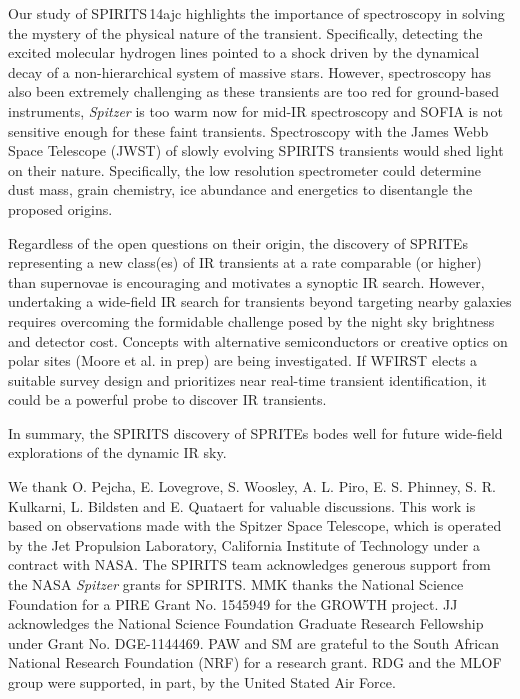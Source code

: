 \documentclass[twocolumn,times]{aastex6}
\begin{document}
Our study of  SPIRITS\,14ajc highlights the importance of spectroscopy in solving the mystery of the physical nature
of the transient. Specifically, detecting the excited molecular hydrogen lines pointed to a shock driven by the dynamical
decay of a non-hierarchical system of massive stars. However, spectroscopy has also been extremely challenging as these transients are
too red for ground-based instruments, {\it Spitzer} is too warm now for mid-IR spectroscopy and SOFIA is not sensitive enough for these
faint transients. Spectroscopy with the James Webb Space Telescope (JWST) of slowly evolving SPIRITS transients 
would shed light on their nature. Specifically, the low resolution spectrometer could determine dust mass, 
grain chemistry, ice abundance and energetics to disentangle the proposed origins.
   
Regardless of the open questions on their origin, the discovery of SPRITEs representing a new class(es) of IR transients at a rate 
comparable (or higher) than supernovae is encouraging and motivates a synoptic IR search. However, undertaking a wide-field IR search for transients
beyond targeting nearby galaxies requires overcoming the formidable challenge posed by the night sky brightness and detector cost. Concepts with alternative semiconductors \citep{Sullivan2014} or
creative optics on polar sites (Moore et al. in prep) are being investigated. If WFIRST elects a suitable survey design and prioritizes near real-time transient 
identification, it could be a powerful probe to discover IR transients.  

In summary, the SPIRITS discovery of SPRITEs bodes well for future wide-field explorations of the dynamic 
IR sky.

\bigskip
\bigskip
We thank O. Pejcha, E. Lovegrove, S. Woosley, A. L. Piro, E. S. Phinney, S. R. Kulkarni, L. Bildsten and E. Quataert for valuable discussions. 
This work is based on observations made with the Spitzer Space Telescope, which is operated by the Jet Propulsion Laboratory, California Institute of Technology under a contract with NASA. 
The SPIRITS team acknowledges generous support from the NASA {\it Spitzer} grants for SPIRITS. 
MMK thanks the National Science Foundation for a PIRE Grant No. 1545949 for the GROWTH project. JJ acknowledges the National Science Foundation Graduate Research Fellowship under 
Grant No. DGE-1144469. PAW and SM are grateful to the South African National Research Foundation (NRF) for a research grant.
RDG and the MLOF group were supported, in part, by the United Stated Air Force.
\end{document}
